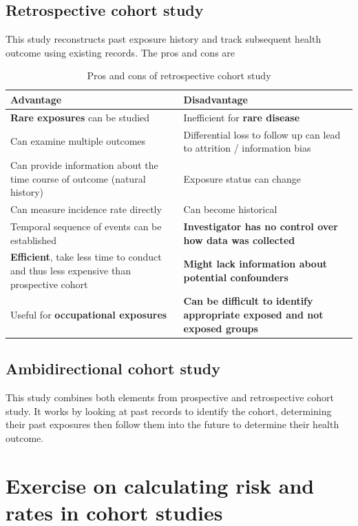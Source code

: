 \documentclass{article}
\begin{document}
\subsection{Retrospective cohort study}
This study reconstructs past exposure history and track subsequent health outcome using existing records. The pros and cons are
\begin{table}[H]
\centering
\begin{tabularx}{\textwidth}{|X|X|}
\hline
\textbf{Advantage} & \textbf{Disadvantage} \\ \hline
\textbf{Rare exposures} can be studied   & Inefficient for \textbf{rare disease} \\ \hline
Can examine multiple outcomes   & Differential loss to follow up can lead to attrition / information bias \\ \hline
Can provide information about the time course of outcome (natural history) & Exposure status can change \\ \hline
Can measure incidence rate directly & Can become historical \\ \hline
Temporal sequence of events can be established  & \textbf{Investigator has no control over how data was collected} \\ \hline
\textbf{Efficient}, take less time to conduct and thus less expensive than prospective cohort & \textbf{Might lack information about potential confounders} \\ \hline
Useful for \textbf{occupational exposures} & \textbf{Can be difficult to identify appropriate exposed and not exposed groups} \\ \hline
\end{tabularx}
\caption{Pros and cons of retrospective cohort study}
\label{tab:pros-cons-retrospective-cohort-study}
\end{table}

\subsection{Ambidirectional cohort study}
This study combines both elements from prospective and retrospective cohort study. It works by looking at past records to identify the cohort, determining their past exposures then follow them into the future to determine their health outcome.

\pagebreak
\section{Exercise on calculating risk and rates in cohort studies}
\end{document}
